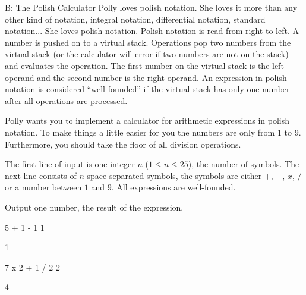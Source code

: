 \begin{problem}{B: The Polish Calculator}
Polly loves polish notation.
She loves it more than any other kind of notation, integral notation, differential notation, standard notation...
She loves polish notation.
Polish notation is read from right to left.
A number is pushed on to a virtual stack.
Operations pop two numbers from the virtual stack (or the calculator will error if two numbers are not on the stack) and evaluates the operation.
The first number on the virtual stack is the left operand and the second number is the right operand.
An expression in polish notation is considered ``well-founded'' if the virtual stack has only one number after all operations are processed.

Polly wants you to implement a calculator for arithmetic expressions in polish notation.
To make things a little easier for you the numbers are only from 1 to 9.
Furthermore, you should take the floor of all division operations.
\end{problem}

\begin{formalin}
The first line of input is one integer $n$ ($1 \leq n \leq 25$), the number of symbols.
The next line consists of $n$ space separated symbols, the symbols are either $+$, $-$, $x$, $/$ or a number between $1$ and $9$.
All expressions are well-founded.
\end{formalin}

\begin{formalout}
Output one number, the result of the expression.
\end{formalout}

\begin{datain}
5
+ 1 - 1 1
\end{datain}
\begin{dataout}
1
\end{dataout}

\begin{datain}
7
x 2 + 1 / 2 2
\end{datain}
\begin{dataout}
4
\end{dataout}

